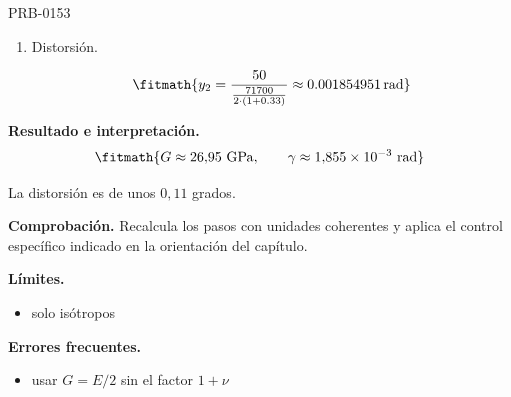 \begin{studiumworked}{PRB-0153}
\begin{enumerate}
\[\fitmath{y_{1}=\frac{71700}{2\cdot \left(1+0.33\right)}\approx 26954.89\,\mathrm{MPa}}\]

\item Distorsión.

\[\fitmath{y_{2}=\frac{50}{\frac{71700}{2\cdot \left(1+0.33\right)}}\approx 0.001854951\,\mathrm{rad}}\]

\end{enumerate}

\textbf{Resultado e interpretación.}\[\fitmath{G \approx 26{,}95\ \mathrm{GPa},\qquad \gamma \approx 1{,}855\times 10^{-3}\ \mathrm{rad}}\]

La distorsión es de unos $0{,}11$ grados.

\par\textbf{Comprobación.} Recalcula los pasos con unidades coherentes y aplica el control específico indicado en la orientación del capítulo.

\textbf{Límites.}\begin{itemize}\item solo isótropos\end{itemize}

\textbf{Errores frecuentes.}\begin{itemize}\item usar $G = E/2$ sin el factor $1+\nu$\end{itemize}

\end{studiumworked}

\Needspace{.3\textheight}

